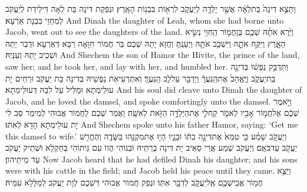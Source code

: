 \newperek
{}%
{וַתֵּצֵ֤א דִינָה֙ בַּת\maqqaf לֵאָ֔ה אֲשֶׁ֥ר יָלְדָ֖ה לְיַעֲקֹ֑ב לִרְא֖וֹת בִּבְנ֥וֹת הָאָֽרֶץ׃}
{וּנְפַקַת דִּינָה בַּת לֵאָה דִּילֵידַת לְיַעֲקֹב לְמִחְזֵי בִּבְנָת אַרְעָא׃}
{And Dinah the daughter of Leah, whom she had borne unto Jacob, went out to see the daughters of the land.}{}
{וַיַּ֨רְא אֹתָ֜הּ שְׁכֶ֧ם בֶּן\maqqaf חֲמ֛וֹר הַֽחִוִּ֖י נְשִׂ֣יא הָאָ֑רֶץ וַיִּקַּ֥ח אֹתָ֛הּ וַיִּשְׁכַּ֥ב אֹתָ֖הּ וַיְעַנֶּֽהָ׃}
{וַחֲזָא יָתַהּ שְׁכֶם בַּר חֲמוֹר חִוָּאָה רַבָּא דְּאַרְעָא וּדְבַר יָתַהּ וּשְׁכֵיב יָתַהּ וְעַנְּיַהּ׃}
{And Shechem the son of Hamor the Hivite, the prince of the land, saw her; and he took her, and lay with her, and humbled her.}{}
{וַתִּדְבַּ֣ק נַפְשׁ֔וֹ בְּדִינָ֖ה בַּֽת\maqqaf יַעֲקֹ֑ב וַיֶּֽאֱהַב֙ אֶת\maqqaf הַֽנַּעֲרָ֔ וַיְדַבֵּ֖ר עַל\maqqaf לֵ֥ב הַֽנַּעֲרָֽ׃}
{וְאִתְרְעִיאַת נַפְשֵׁיהּ בְּדִינָה בַּת יַעֲקֹב וּרְחֵים יָת עוּלֵימְתָא וּמַלִּיל עַל לִבַּהּ דְּעוּלֵימְתָא׃}
{And his soul did cleave unto Dinah the daughter of Jacob, and he loved the damsel, and spoke comfortingly unto the damsel.}{}
{וַיֹּ֣אמֶר שְׁכֶ֔ם אֶל\maqqaf חֲמ֥וֹר אָבִ֖יו לֵאמֹ֑ר קַֽח\maqqaf לִ֛י אֶת\maqqaf הַיַּלְדָּ֥ה הַזֹּ֖את לְאִשָּֽׁה׃}
{וַאֲמַר שְׁכֶם לַחֲמוֹר אֲבוּהִי לְמֵימַר סַב לִי יָת עוּלֵימְתָא הָדָא לְאִתּוּ׃}
{And Shechem spoke unto his father Hamor, saying: ‘Get me this damsel to wife.’}{}
{וְיַעֲקֹ֣ב שָׁמַ֗ע כִּ֤י טִמֵּא֙ אֶת\maqqaf דִּינָ֣ה בִתּ֔וֹ וּבָנָ֛יו הָי֥וּ אֶת\maqqaf מִקְנֵ֖הוּ בַּשָּׂדֶ֑ה וְהֶחֱרִ֥שׁ יַעֲקֹ֖ב עַד\maqqaf בֹּאָֽם׃}
{וְיַעֲקֹב שְׁמַע אֲרֵי סַאֵיב יָת דִּינָה בְרַתֵּיהּ וּבְנוֹהִי הֲווֹ עִם גֵּיתוֹהִי בְּחַקְלָא וּשְׁתֵיק יַעֲקֹב עַד מֵיתֵיהוֹן׃}
{Now Jacob heard that he had defiled Dinah his daughter; and his sons were with his cattle in the field; and Jacob held his peace until they came.}{}
{וַיֵּצֵ֛א חֲמ֥וֹר אֲבִֽי\maqqaf שְׁכֶ֖ם אֶֽל\maqqaf יַעֲקֹ֑ב לְדַבֵּ֖ר אִתּֽוֹ׃}
{וּנְפַק חֲמוֹר אֲבוּהִי דִּשְׁכֶם לְוָת יַעֲקֹב לְמַלָּלָא עִמֵּיהּ׃}
